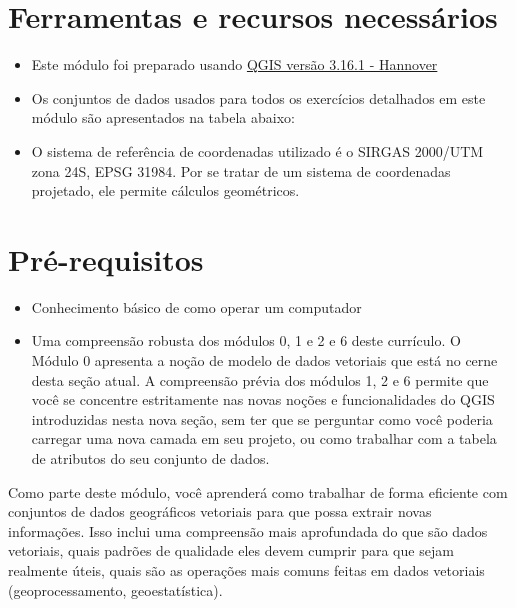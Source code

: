 \documentclass[
]{book}
\providecommand{\tightlist}{%
  \setlength{\itemsep}{0pt}\setlength{\parskip}{0pt}}
\begin{document}
\hypertarget{ferramentas-e-recursos-necessuxe1rios-7}{%
\section{Ferramentas e recursos necessários}\label{ferramentas-e-recursos-necessuxe1rios-7}}

\begin{itemize}
\tightlist
\item
  Este módulo foi preparado usando \href{https://qgis.org/en/site/forusers/download.html}{QGIS versão 3.16.1 - Hannover}
\item
  Os conjuntos de dados usados \hspace{0pt}\hspace{0pt}para todos os exercícios detalhados em este módulo são apresentados na tabela abaixo:
\item
  O sistema de referência de coordenadas utilizado é o SIRGAS 2000/UTM zona 24S, EPSG 31984. Por se tratar de um sistema de coordenadas projetado, ele permite cálculos geométricos.
\end{itemize}

\hypertarget{pruxe9-requisitos-8}{%
\section{Pré-requisitos}\label{pruxe9-requisitos-8}}

\begin{itemize}
\tightlist
\item
  Conhecimento básico de como operar um computador
\item
  Uma compreensão robusta dos módulos 0, 1 e 2 e 6 deste currículo. O Módulo 0 apresenta a noção de modelo de dados vetoriais que está no cerne desta seção atual. A compreensão prévia dos módulos 1, 2 e 6 permite que você se concentre estritamente nas novas noções e funcionalidades do QGIS introduzidas nesta nova seção, sem ter que se perguntar como você poderia carregar uma nova camada em seu projeto, ou como trabalhar com a tabela de atributos do seu conjunto de dados.
\end{itemize}

Como parte deste módulo, você aprenderá como trabalhar de forma eficiente com conjuntos de dados geográficos vetoriais para que possa extrair novas informações. Isso inclui uma compreensão mais aprofundada do que são dados vetoriais, quais padrões de qualidade eles devem cumprir para que sejam realmente úteis, quais são as operações mais comuns feitas em dados vetoriais (geoprocessamento, geoestatística).
\end{document}
